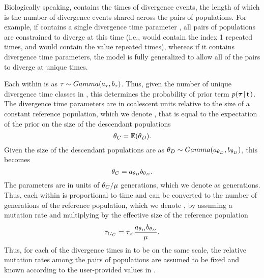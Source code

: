 Biologically speaking, \divTimeVector contains the times of divergence events,
the length of which \divTimeNum is the number of divergence events shared across
the \npairs{} pairs of populations.
For example, if \divTimeVector contains a single divergence time parameter
, all \npairs{} pairs of populations are constrained to diverge at
this time (i.e., \divTimeIndexVector would contain the index 1 repeated
\npairs{} times, and \divTimeMapVector would contain the value 
repeated \npairs{} times), whereas if it contains \npairs{} divergence time
parameters, the model is fully generalized to allow all of the pairs to diverge
at unique times.

\begin{linenomath}
Each \divTime{} within \divTimeVector is \iid as $\tau_{} \sim
Gamma(a_{\tau_{}}, b_{\tau_{}})$.
Thus, given the number of unique divergence time classes in
\divTimeIndexVector, this determines the probability of prior term
$p(\boldsymbol{\tau_{}} \,|\, \mathbf{t_{}})$.
The divergence time parameters are in coalescent units relative to the size of
a constant reference population, which we denote , that is equal to
the expectation of the prior on the size of the descendant populations
\begin{equation}
    \myTheta{C} = \mathbb{E}(\descendantTheta{}{}).
    \label{eq:thetaC}
\end{equation}
Given the size of the descendant populations are \iid as
$\descendantTheta{}{} \sim Gamma(\gammaShape{\descendantTheta{}{}},
\gammaScale{\descendantTheta{}{}})$,
this becomes
\begin{equation}
    \myTheta{C} = \gammaShape{\descendantTheta{}{}}\gammaScale{\descendantTheta{}{}}.
    \label{eq:thetaCGamma}
\end{equation}
The \divTime{} parameters are in units of $\theta_{C}/\mu$
generations, which we denote as \globalcoalunit generations.
Thus, each \divTime{} within \divTimeVector is proportional to time and can be
converted to the number of generations of the reference population, which we
denote , by assuming a mutation rate and multiplying by the
effective size of the reference population
\begin{equation}
    \divTime{G_C} = \divTime \times \frac{
        \gammaShape{\descendantTheta{}{}}\gammaScale{\descendantTheta{}{}}}
        {\mutationRate}.
    \label{eq:divTimeGenerations}
\end{equation}
Thus, for each of the divergence times in \divTimeVector to be on the same
scale, the relative mutation rates among the pairs of populations are assumed
to be fixed and known according to the user-provided values in
\mutationRateScalarConstantVector.
\end{linenomath}

